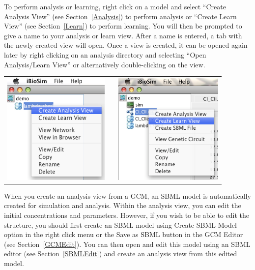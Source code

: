 \documentclass[titlepage,11pt]{article}
\begin{document}
\noindent
To perform analysis or learning, right click on a model and
select ``Create Analysis View'' (see Section~\ref{Analysis})
to perform analysis or ``Create Learn View'' (see Section~\ref{Learn})
to perform learning. You will then be prompted to give a name to
your analysis or learn view. After a name is entered, a tab with
the newly created view will open. Once a view is created, it can
be opened again later by right clicking on an analysis directory
and selecting ``Open Analysis/Learn View'' or alternatively
double-clicking on the view.
\begin{center}
\begin{tabular}{ccc}
\includegraphics[height=55mm]{screenshots/createAnalysis} & & 
\includegraphics[height=55mm]{screenshots/createLearn}
\end{tabular}
\end{center}

When you create an analysis view from a GCM, an SBML model is
automatically created for simulation and analysis. Within the
analysis view, you can edit the initial concentrations and
parameters. However, if you wish to be able to edit the
structure, you should first create an SBML model using Create
SBML Model option in the right click menu or the Save as SBML button in
the GCM Editor (see Section~\ref{GCMEdit}).  You can then open and
edit this model using an SBML editor (see Section~\ref{SBMLEdit}) and
create an analysis view from this edited model.
\end{document}
